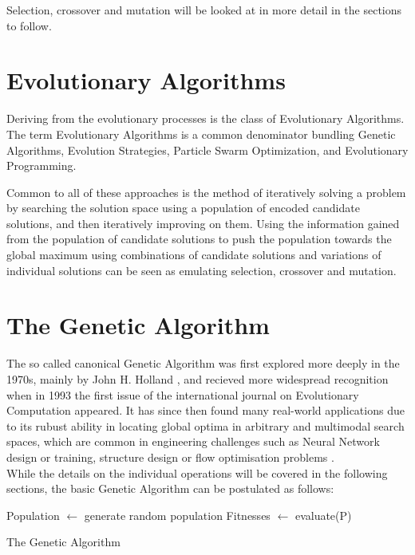 \documentclass[11pt,a4paper,twoside,openright]{scrbook}
\begin{document}
Selection, crossover and mutation will be looked at in more detail in the sections to follow.

\section{Evolutionary Algorithms}

Deriving from the evolutionary processes is the class of Evolutionary Algorithms.
The term Evolutionary Algorithms is a common denominator bundling Genetic Algorithms, Evolution Strategies, Particle Swarm Optimization, and Evolutionary Programming. \cite{Schwefel95,Kennedy11}

Common to all of these approaches is the method of iteratively solving a problem by searching the solution space using a population of encoded candidate solutions, and then iteratively improving on them. Using the information gained from the population of candidate solutions to push the population towards the global maximum using combinations of candidate solutions and variations of individual solutions can be seen as emulating selection, crossover and mutation. \cite[p.\,1]{Schwefel95}

\section{The Genetic Algorithm}

The so called canonical Genetic Algorithm was first explored more deeply in the 1970s, mainly by John H. Holland \cite{Holland75}, and recieved more widespread recognition when in 1993 the first issue of the international journal on Evolutionary Computation \cite{DeJong93} appeared.
It has since then found many real-world applications due to its rubust ability in locating global optima in arbitrary and multimodal search spaces, which are common in engineering challenges such as Neural Network design or training, structure design or flow optimisation problems \cite{Srinivas94}. \\

While the details on the individual operations will be covered in the following sections, the basic Genetic Algorithm can be postulated as follows:

\bigskip
\begin{algorithm}[H]\label{alg:GA}
\SetAlgoLined
{}
Population \(\leftarrow\) generate random population\;
Fitnesses \(\leftarrow\) evaluate(P)\;
\caption{The Genetic Algorithm}
\end{algorithm}
\end{document}
